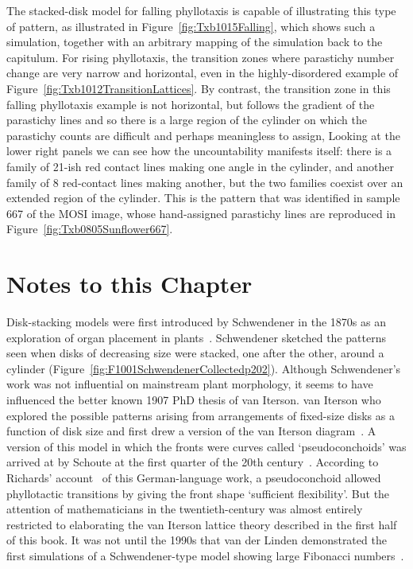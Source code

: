 The stacked-disk model for falling phyllotaxis is  capable of illustrating this type of pattern, as illustrated in Figure~\ref{fig:Txb1015Falling}, which 
shows such a simulation, together with an arbitrary mapping of the simulation back to the capitulum. 
For rising phyllotaxis, the transition zones where parastichy number change are very narrow and horizontal, even in the highly-disordered example of Figure~\ref{fig:Txb1012TransitionLattices}. By contrast, the transition zone in this falling phyllotaxis example is not horizontal, but follows the gradient of the parastichy lines and so  there is a large region of the cylinder on which the parastichy counts are difficult and perhaps meaningless to assign, Looking at the lower right panels we can see how the uncountability manifests itself: there is a family of 21-ish red contact lines making one angle in the cylinder, and another family of 8 red-contact lines making another, but the two families coexist over an extended region of the cylinder. This is the pattern that was identified in sample 667 of the MOSI image, whose hand-assigned parastichy lines are reproduced in Figure~\ref{fig:Txb0805Sunflower667}.
 
 
\clearpage
\section{Notes to this Chapter}Disk-stacking models were first introduced by Schwendener in the 1870s as an exploration of organ placement in plants~\cite{schwendenerMechanischeTheorieBlattstellungen1878}.  Schwendener sketched the patterns seen when disks of decreasing size were stacked, one after the other, around a cylinder (Figure~\ref{fig:F1001SchwendenerCollectedp202}).
Although Schwendener's work was not influential on mainstream plant morphology, it seems to have influenced the better known 1907 PhD thesis of van Iterson. van Iterson  who explored the possible patterns arising from arrangements of fixed-size disks as a function of disk size and first drew a version of the van Iterson diagram~\cite{vanitersonjrMathematischeUndMikroscopischAnatomische1907}. 
A version of this model in which the fronts were curves called `pseudoconchoids'  was  arrived at by Schoute at the first quarter of the 20th century~\cite{schouteUberPseudokonchoiden1913}. According to  Richards' account~\cite{richardsGeometryPhyllotaxisIts1948}  of this German-language work, a pseudoconchoid allowed phyllotactic transitions by giving the front shape `sufficient flexibility'. But 
the attention of mathematicians in the twentieth-century was almost entirely restricted to elaborating the van Iterson lattice theory described in the first half of this book.  It was not until the  1990s that van der Linden demonstrated the first simulations of a Schwendener-type model showing large Fibonacci numbers~\cite{vanderlindenCreatingPhyllotaxisDislodgement1990}.

